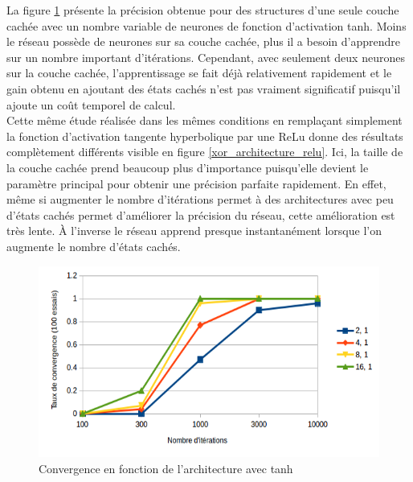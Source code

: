 \documentclass{report}
\theoremstyle{plain}
\theoremstyle{definition}
\theoremstyle{remark}
\begin{document}
La figure \ref{xor_architecture_tanh} présente la précision obtenue pour des structures d'une seule couche cachée avec un nombre variable de neurones de fonction d'activation tanh. Moins le réseau possède de neurones sur sa couche cachée, plus il a besoin d'apprendre sur un nombre important d'itérations. Cependant, avec seulement deux neurones sur la couche cachée, l'apprentissage se fait déjà relativement rapidement et le gain obtenu en ajoutant des états cachés n'est pas vraiment significatif puisqu'il ajoute un coût temporel de calcul.\\

Cette même étude réalisée dans les mêmes conditions en remplaçant simplement la fonction d'activation tangente hyperbolique par une ReLu donne des résultats complètement différents visible en figure \ref{xor_architecture_relu}. Ici, la taille de la couche cachée prend beaucoup plus d'importance puisqu'elle devient le paramètre principal pour obtenir une précision parfaite rapidement. En effet, même si augmenter le nombre d'itérations permet à des architectures avec peu d'états cachés permet d'améliorer la précision du réseau, cette amélioration est très lente. \`A l'inverse le réseau apprend presque instantanément lorsque l'on augmente le nombre d'états cachés.\\

\begin{figure}[!h]
\begin{center}
\includegraphics[scale=0.6]{images/xor_architecture_tanh.png}
\caption{Convergence en fonction de l'architecture avec tanh}
\label{xor_architecture_tanh}
\end{center}
\end{figure}
\end{document}
